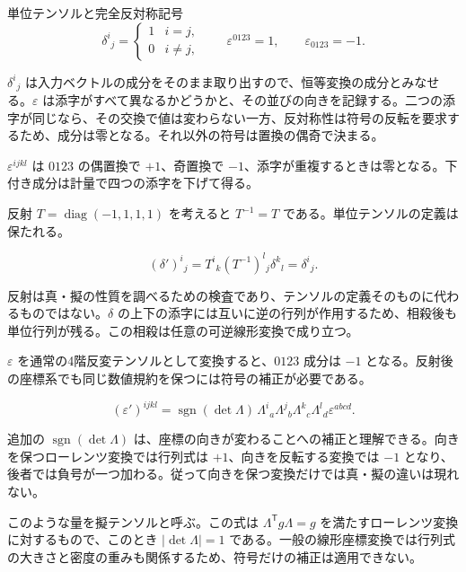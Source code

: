 \documentclass[a4paper,12pt]{article}
\begin{document}
\begin{definitionBox}{単位テンソルと完全反対称記号}
\begin{equation}\label{symbols}
\delta^i{}_j=\begin{cases}1&i=j,\\0&i\ne j,\end{cases}\qquad \varepsilon^{0123}=1,\qquad \varepsilon_{0123}=-1.
\end{equation}
\end{definitionBox}

$\delta^i{}_j$ は入力ベクトルの成分をそのまま取り出すので、恒等変換の成分とみなせる。$\varepsilon$ は添字がすべて異なるかどうかと、その並びの向きを記録する。二つの添字が同じなら、その交換で値は変わらない一方、反対称性は符号の反転を要求するため、成分は零となる。それ以外の符号は置換の偶奇で決まる。

$\varepsilon^{ijkl}$ は $0123$ の偶置換で $+1$、奇置換で $-1$、添字が重複するときは零となる。下付き成分は計量で四つの添字を下げて得る。

反射 $T=\operatorname{diag}(-1,1,1,1)$ を考えると $T^{-1}=T$ である。単位テンソルの定義は保たれる。

\begin{equation}\label{delta-transform}
(\delta')^i{}_j=T^i{}_k(T^{-1})^l{}_j\delta^k{}_l=\delta^i{}_j.
\end{equation}

反射は真・擬の性質を調べるための検査であり、テンソルの定義そのものに代わるものではない。$\delta$ の上下の添字には互いに逆の行列が作用するため、相殺後も単位行列が残る。この相殺は任意の可逆線形変換で成り立つ。

$\varepsilon$ を通常の4階反変テンソルとして変換すると、$0123$ 成分は $-1$ となる。反射後の座標系でも同じ数値規約を保つには符号の補正が必要である。

\begin{equation}\label{epsilon-transform}
(\varepsilon')^{ijkl}=\operatorname{sgn}(\det\Lambda)\,\Lambda^i{}_a\Lambda^j{}_b\Lambda^k{}_c\Lambda^l{}_d\varepsilon^{abcd}.
\end{equation}

追加の $\operatorname{sgn}(\det\Lambda)$ は、座標の向きが変わることへの補正と理解できる。向きを保つローレンツ変換では行列式は $+1$、向きを反転する変換では $-1$ となり、後者では負号が一つ加わる。従って向きを保つ変換だけでは真・擬の違いは現れない。

このような量を擬テンソルと呼ぶ。この式は $\Lambda^{\mathsf T}g\Lambda=g$ を満たすローレンツ変換に対するもので、このとき $|\det\Lambda|=1$ である。一般の線形座標変換では行列式の大きさと密度の重みも関係するため、符号だけの補正は適用できない。
\end{document}
